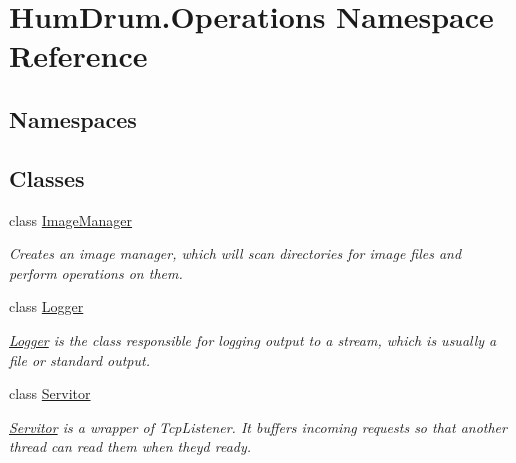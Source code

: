 \hypertarget{namespaceHumDrum_1_1Operations}{}\section{Hum\+Drum.\+Operations Namespace Reference}
\label{namespaceHumDrum_1_1Operations}
\subsection*{Namespaces}
\begin{DoxyCompactItemize}
\end{DoxyCompactItemize}
\subsection*{Classes}
\begin{DoxyCompactItemize}
\item 
class \hyperlink{classHumDrum_1_1Operations_1_1ImageManager}{Image\+Manager}
\begin{DoxyCompactList}\small\item\em Creates an image manager, which will scan directories for image files and perform operations on them. \end{DoxyCompactList}\item 
class \hyperlink{classHumDrum_1_1Operations_1_1Logger}{Logger}
\begin{DoxyCompactList}\small\item\em \hyperlink{classHumDrum_1_1Operations_1_1Logger}{Logger} is the class responsible for logging output to a stream, which is usually a file or standard output. \end{DoxyCompactList}\item 
class \hyperlink{classHumDrum_1_1Operations_1_1Servitor}{Servitor}
\begin{DoxyCompactList}\small\item\em \hyperlink{classHumDrum_1_1Operations_1_1Servitor}{Servitor} is a wrapper of Tcp\+Listener. It buffers incoming requests so that another thread can read them when they\textquotesingle{}d ready. \end{DoxyCompactList}\end{DoxyCompactItemize}
